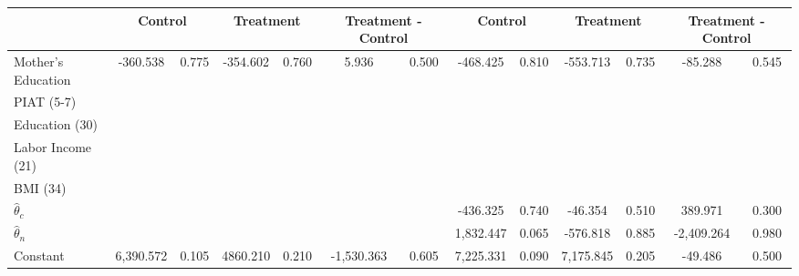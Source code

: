 \begin{tabular}{lcccccccccccc} \toprule
&\multicolumn{2}{c}{Control} & \multicolumn{2}{c}{Treatment} & \multicolumn{2}{c}{Treatment - Control} & \multicolumn{2}{c}{Control} & \multicolumn{2}{c}{Treatment} & \multicolumn{2}{c}{Treatment - Control} \\ \midrule
Mother's Education  &  -360.538 &     0.775 &  -354.602 &     0.760 &     5.936 &     0.500 &  -468.425 &     0.810 &  -553.713 &     0.735 &   -85.288 &     0.545 \\  
PIAT (5-7) &         &         &         &         &         &         &         &         &         &         &         &         \\  
Education (30) &         &         &         &         &         &         &         &         &         &         &         &         \\  
Labor Income (21)  &         &         &         &         &         &         &         &         &         &         &         &         \\  
BMI (34) &         &         &         &         &         &         &         &         &         &         &         &         \\  
$\hat{\theta}_{c}$ &         &         &         &         &         &         &  -436.325 &     0.740 &   -46.354 &     0.510 &   389.971 &     0.300 \\  
$\hat{\theta}_{n}$ &         &         &         &         &         &         &  1,832.447 &     0.065 &  -576.818 &     0.885 & -2,409.264 &     0.980 \\  
Constant &  6,390.572 &     0.105 &  4860.210 &     0.210 & -1,530.363 &     0.605 &  7,225.331 &     0.090 &  7,175.845 &     0.205 &   -49.486 &     0.500 \\ \bottomrule \end{tabular}
